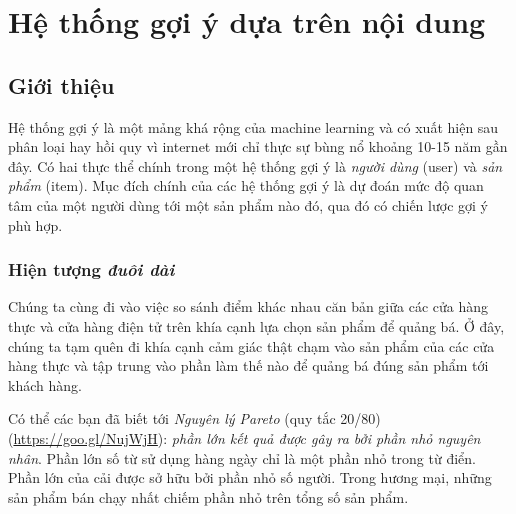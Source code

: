 \chapter{Hệ thống gợi ý dựa trên nội dung}


\section{Giới thiệu}
Hệ thống gợi ý là một mảng khá rộng của machine learning và có
xuất hiện sau phân loại hay hồi quy vì internet mới
chỉ thực sự bùng nổ khoảng 10-15 năm gần đây. Có hai thực thể chính trong một
hệ thống gợi ý là \textit{người dùng} (user) và \textit{sản phẩm} (item). Mục đích chính của các hệ thống gợi ý là dự đoán mức độ quan tâm của một người dùng tới một sản phẩm nào đó, qua đó có chiến lược gợi ý phù hợp.


\subsection{Hiện tượng \textit{đuôi dài}}

Chúng ta cùng đi vào việc so sánh điểm khác nhau căn bản giữa các {cửa
hàng thực} và {cửa hàng điện tử} trên khía cạnh lựa chọn sản
phẩm để quảng bá. {Ở đây, chúng ta tạm quên đi khía cạnh {cảm giác
thật chạm vào sản phẩm} của các cửa hàng thực và tập trung vào phần làm
thế nào để quảng bá đúng sản phẩm tới khách hàng.}

Có thể các bạn đã biết tới \textit{Nguyên lý Pareto} (quy tắc 20/80)
(\url{https://goo.gl/NujWjH}): \textit{phần lớn kết quả được gây ra bởi phần nhỏ
nguyên nhân}. Phần lớn số từ sử dụng hàng ngày chỉ là một phần nhỏ trong
từ điển. Phần lớn của cải được sở hữu bởi phần nhỏ số người. Trong hương
mại, những sản phẩm bán chạy nhất chiếm phần nhỏ trên tổng số sản phẩm.

